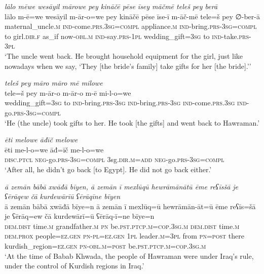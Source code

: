 \ea \label{ŽP.264}
\textit{lālo mēwe wesāyil mārowe pey kināčē pēse īsey māčmē teleš pey berā} \\ 
\gll lālo m-ē=we wesāyil m-ār-o=we pey kināčē pēse īse-ī m-āč-mē tele=š pey ∅-ber-ā \\ 
 maternal\_uncle\textsc{.m} \textsc{ind-}come\textsc{.prs}\textsc{.3sg}\textsc{=compl} appliance\textsc{.m} \textsc{ind-}bring\textsc{.prs}\textsc{-3sg}\textsc{=compl} to girl\textsc{.dir}\textsc{.f} as\_if now\textsc{-obl}\textsc{.m} \textsc{ind-}say\textsc{.prs}\textsc{-1pl} wedding\_gift\textsc{=3sg} to \textsc{ind-}take\textsc{.prs}\textsc{-3pl} \\ 
\glt `The uncle went back. He brought household equipment for the girl, just like nowadays when we say, ‘They [the bride’s family] take gifts for her [the bride].’'
\z 
 
\ea \label{ŽP.265}
\textit{teleš pey māro māro mē milowe} \\ 
\gll tele=š pey m-ār-o m-ār-o m-ē mi-l-o=we \\ 
 wedding\_gift\textsc{=3sg} to \textsc{ind-}bring\textsc{.prs}\textsc{-3sg} \textsc{ind-}bring\textsc{.prs}\textsc{-3sg} \textsc{ind-}come\textsc{.prs}\textsc{.3sg} \textsc{ind-}go\textsc{.prs}\textsc{-3sg}\textsc{=compl} \\ 
\glt `He (the uncle) took gifts to her. He took [the gifts] and went back to Hawraman.'
\z 
 
\ea \label{ŽP.266}
\textit{ēti melowe āđīč melowe} \\ 
\gll ēti me-l-o=we āđ=īč me-l-o=we \\ 
 \textsc{disc.ptcl} \textsc{neg-}go\textsc{.prs}\textsc{-3sg}\textsc{=compl} 3sg\textsc{.dir}\textsc{.m}\textsc{=add} \textsc{neg-}go\textsc{.prs}\textsc{-3sg}\textsc{=compl} \\ 
\glt `After all, he didn’t go back [to Egypt]. He did not go back either.'
\z 
 
\ea \label{BP.9}
\textit{ā zemān bābā xwāđā bīyen, ā zemān ī mexlūqū hewrāmānātū ēme reʕīsšā je ʕērāqew čā kurdewārīū ʕērāqīne bīyen} \\ 
\gll ā zemān bābā xwāđā bīye=n ā zemān ī mexlūq=ū hewrāmān-āt=ū ēme reʕīs=šā je ʕērāq=ew čā kurdewārī=ū ʕērāq-ī=ne bīye=n \\ 
 \textsc{dem.dist} time\textsc{.m} grandfather\textsc{.m} \textsc{pn} be\textsc{.pst}\textsc{.ptcp}\textsc{.m}\textsc{=cop}\textsc{.3sg}\textsc{.m} \textsc{dem.dist} time\textsc{.m} \textsc{dem.prox} people\textsc{=ez.gen} \textsc{pn}\textsc{\textsc{-pl}}\textsc{=ez.gen} \textsc{1pl} leader\textsc{.m}\textsc{=3pl} from \textsc{pn}\textsc{=\textsc{post}} there kurdish\_region\textsc{=ez.gen} \textsc{pn}\textsc{-obl}\textsc{.m}\textsc{=\textsc{post}} be\textsc{.pst}\textsc{.ptcp}\textsc{.m}\textsc{=cop}\textsc{.3sg}\textsc{.m} \\ 
\glt `At the time of Babab Khwada, the people of Hawraman were under Iraq’s rule, under the control of Kurdish regions in Iraq.'
\z 
 
